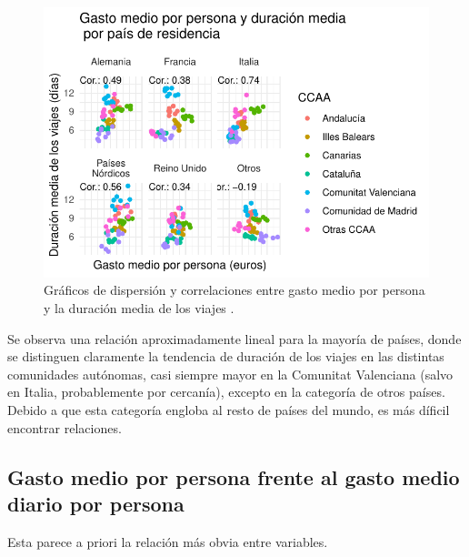 \documentclass[data,article,submit,moreauthors,pdftex]{Definitions/mdpi}
\begin{document}
\begin{figure}[H]
\includegraphics{ProyectoAED2024_Rmd_files/figure-latex/unnamed-chunk-29-1} \caption{Gráficos de dispersión y correlaciones entre gasto medio por persona y la duración media de los viajes .\label{fig:gastomediovsduracionmedia}}\label{fig:unnamed-chunk-29}
\end{figure}

Se observa una relación aproximadamente lineal para la mayoría de
países, donde se distinguen claramente la tendencia de duración de los
viajes en las distintas comunidades autónomas, casi siempre mayor en la
Comunitat Valenciana (salvo en Italia, probablemente por cercanía),
excepto en la categoría de otros países. Debido a que esta categoría
engloba al resto de países del mundo, es más díficil encontrar
relaciones.

\subsection{Gasto medio por persona frente al gasto medio diario por
persona}\label{gasto-medio-por-persona-frente-al-gasto-medio-diario-por-persona}

Esta parece a priori la relación más obvia entre variables.
\end{document}
